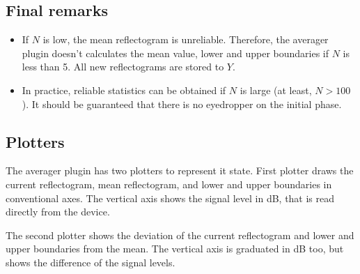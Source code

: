 \subsection{Final remarks}
\begin{itemize}
	\item If $N$ is low, the mean reflectogram is unreliable. Therefore, the averager plugin doesn't calculates the mean value, lower and upper boundaries if $N$ is less than 5. All new reflectograms are stored to $Y$. 
	\item In practice, reliable statistics can be obtained if $N$ is large (at least, $N > 100$). It should be guaranteed that there is no eyedropper on the initial phase.
\end{itemize}

\subsection{Plotters}
The averager plugin has two plotters to represent it state. First plotter draws the current reflectogram, mean reflectogram, and lower and upper boundaries in conventional axes. The vertical axis shows the signal level in dB, that is read directly from the device. 

The second plotter shows the deviation of the current reflectogram and lower and upper boundaries from the mean. The vertical axis is graduated in dB too, but shows the difference of the signal levels.


